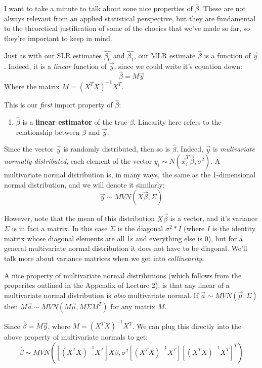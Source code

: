 \documentclass[
]{article}
\providecommand{\tightlist}{%
  \setlength{\itemsep}{0pt}\setlength{\parskip}{0pt}}
\begin{document}
I want to take a minute to talk about sone nice properties of
\(\hat{\beta}\). These are not always relevant from an applied
statistical perspective, but they are fundamental to the theoretical
justification of some of the chocies that we've made so far, so they're
important to keep in mind.

Just as with our SLR estimates \(\hat{\beta_0}\) and \(\hat{\beta_1}\),
our MLR estimate \(\hat{\beta}\) is a function of \(\vec{y}\). Indeed,
it is a \emph{linear} function of \(\vec{y}\), since we could write it's
equation down: \[
\hat{\beta} = M \vec{y}
\] Where the matrix \(M = (X^TX)^{-1} X^T\).

This is our \emph{first} import property of \(\hat{\beta}\):

\begin{enumerate}
\def\labelenumi{\arabic{enumi}.}
\tightlist
\item
  \(\hat{\beta}\) is a \textbf{linear estimator} of the true \(\beta\).
  Linearity here refers to the relationship between \(\hat{\beta}\) and
  \(\vec{y}\).
\end{enumerate}

Since the vector \(\vec{y}\) is randomly distributed, then so is
\(\hat{\beta}\). Indeed, \(\vec{y}\) is \emph{mulivariate normally
distributed}, each element of the vector
\(y_i \sim N( \vec{x}_i^T \vec{\beta}, \sigma^2)\). A multivariate
normal distribution is, in many ways, the same as the 1-dimensional
normal distribution, and we will denote it similarly: \[
\vec{y} \sim MVN( X \vec{\beta}, \Sigma)
\]

However, note that the mean of this distribution \(X \vec{\beta}\) is a
vector, and it's variance \(\Sigma\) is in fact a matrix. In this case
\(\Sigma\) is the diagonal \(\sigma^2 * I\) (where \(I\) is the identity
matrix whose diagonal elements are all 1s and everything else is 0), but
for a general multivariate normal distribution it does not have to be
diagonal. We'll talk more about variance matrices when we get into
\emph{collinearity}.

A nice property of multivariate normal distributions (which follows from
the properites outlined in the Appendix of Lecture 2), is that any
linear of a multivariate normal distribution is \emph{also} multivariate
normal. If \(\vec{a} \sim MVN(\vec{\mu}, \Sigma)\) then
\(M \vec{a} \sim MVN( M \vec{\mu}, M \Sigma M^T )\) for any matrix
\(M\).

Since \(\hat{\beta} = M \vec{y}\), where \(M = (X^TX)^{-1}X^T\). We can
plug this directly into the above property of multivariate normals to
get: \[
\hat{\beta} \sim MVN( \left[(X^TX)^{-1}X^T \right] X \beta, \sigma^2 \left[(X^TX)^{-1}X^T\right] \left[(X^TX)^{-1}X^T\right]^T  )
\]
\end{document}
